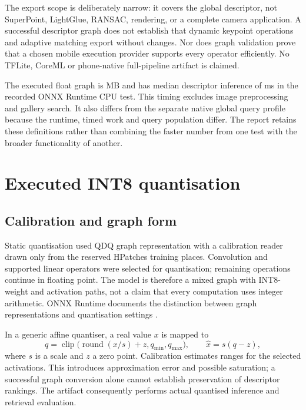 The export scope is deliberately narrow: it covers the global descriptor, not SuperPoint, LightGlue, RANSAC, rendering, or a complete camera application. A successful descriptor graph does not establish that dynamic keypoint operations and adaptive matching export without changes. Nor does graph validation prove that a chosen mobile execution provider supports every operator efficiently. No TFLite, CoreML or phone-native full-pipeline artifact is claimed.

The executed float graph is \FpModelMB{} MB and has median descriptor inference of \FpLatency{} ms in the recorded ONNX Runtime CPU test. This timing excludes image preprocessing and gallery search. It also differs from the separate native global query profile because the runtime, timed work and query population differ. The report retains these definitions rather than combining the faster number from one test with the broader functionality of another.

\section{Executed INT8 quantisation}
\subsection{Calibration and graph form}
Static quantisation used QDQ graph representation with a calibration reader drawn only from the reserved HPatches training places. Convolution and supported linear operators were selected for quantisation; remaining operations continue in floating point. The model is therefore a mixed graph with INT8-weight and activation paths, not a claim that every computation uses integer arithmetic. ONNX Runtime documents the distinction between graph representations and quantisation settings \citep{onnxquant}.

In a generic affine quantiser, a real value $x$ is mapped to
\begin{equation}
 q=\operatorname{clip}\bigl(\operatorname{round}(x/s)+z,q_{\min},q_{\max}\bigr),
 \qquad \widehat x=s(q-z),
\end{equation}
where $s$ is a scale and $z$ a zero point. Calibration estimates ranges for the selected activations. This introduces approximation error and possible saturation; a successful graph conversion alone cannot establish preservation of descriptor rankings. The artifact consequently performs actual quantised inference and retrieval evaluation.

